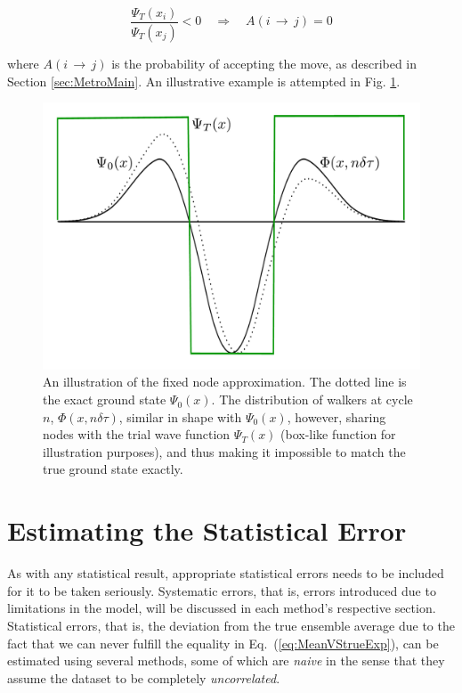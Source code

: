 \begin{equation}
\frac{\Psi_T(x_i)}{\Psi_T(x_j)} < 0 \quad\Longrightarrow\quad A(i\,\rightarrow\,j) = 0
\end{equation}

where $A(i\,\rightarrow\,j)$ is the probability of accepting the move, as described in Section \ref{sec:MetroMain}. An illustrative example is attempted in Fig. \ref{fig:fixxednode}.

\begin{figure}
 \begin{center}
  \includegraphics[scale=0.3]{../Graphics/fixxednode.pdf}
  \caption{An illustration of the fixed node approximation. The dotted line is the exact ground state $\Psi_0(x)$. The distribution of walkers at cycle $n$, $\Phi(x, n\delta\tau)$, similar in shape with $\Psi_0(x)$, however, sharing nodes with the trial wave function $\Psi_T(x)$ (box-like function for illustration purposes), and thus making it impossible to match the true ground state exactly.}
  \label{fig:fixxednode}
 \end{center}
\end{figure}



\section{Estimating the Statistical Error}

As with any statistical result, appropriate statistical errors needs to be included for it to be taken seriously. Systematic errors, that is, errors introduced due to limitations in the model, will be discussed in each method's respective section. Statistical errors, that is, the  deviation from the true ensemble average due to the fact that we can never fulfill the equality in Eq.~(\ref{eq:MeanVStrueExp}), can be estimated using several methods, some of which are \textit{naive} in the sense that they assume the dataset to be completely \textit{uncorrelated}. 

